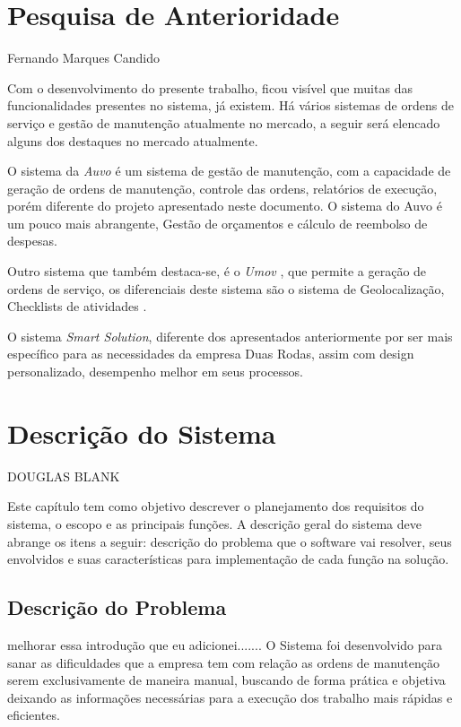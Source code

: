 \chapter{Pesquisa de Anterioridade}

Fernando Marques Candido

Com o desenvolvimento do presente trabalho, ficou visível que muitas das funcionalidades presentes no sistema, já existem. Há vários sistemas de ordens de serviço e gestão de manutenção atualmente no mercado, a seguir será elencado alguns dos destaques no mercado atualmente.

O sistema da \textit{Auvo} é um sistema de gestão de manutenção, com a capacidade de geração de ordens de manutenção, controle das ordens, relatórios de execução, porém diferente do
projeto apresentado neste documento. O sistema do Auvo é um pouco mais abrangente,
Gestão de orçamentos e cálculo de reembolso de despesas.\cite{Auvo2019}

Outro sistema que também destaca-se, é o \textit{Umov} 
, que permite a geração de ordens de serviço,
os diferenciais deste sistema são o sistema de Geolocalização, Checklists de atividades \cite{umov2019}.

O sistema \textit{Smart Solution}, diferente dos apresentados anteriormente por ser mais específico para as
necessidades da empresa Duas Rodas, assim com design personalizado, desempenho melhor em seus processos.


\chapter{Descrição do Sistema }

DOUGLAS BLANK

Este capítulo tem como objetivo descrever o planejamento dos requisitos  do sistema, o escopo e as principais funções. A descrição geral do sistema deve abrange os itens a seguir: descrição do problema que o software vai resolver, seus envolvidos e suas características para implementação de cada função na solução.



\section{Descrição do Problema}
 {\color{red} melhorar essa introdução que eu adicionei.......
 O  Sistema foi desenvolvido para sanar as dificuldades que a empresa tem com relação as ordens de manutenção serem exclusivamente de maneira manual, buscando de forma prática e objetiva deixando as informações necessárias para a execução dos trabalho mais rápidas e eficientes.}

